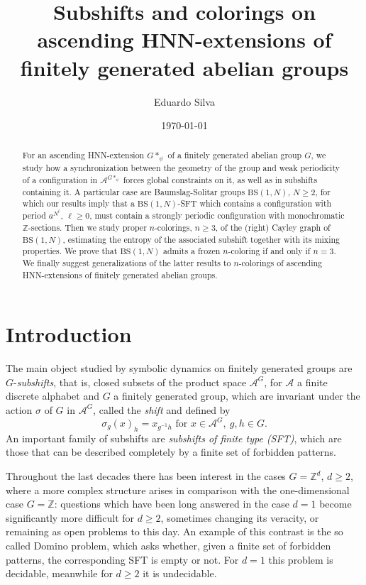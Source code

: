 \documentclass[letterpaper,11pt,reqno]{amsart}
\title{Subshifts and colorings on ascending HNN-extensions of finitely generated abelian groups}
\date{\today}
\author{Eduardo Silva}
\theoremstyle{plain}
\theoremstyle{definition}
\newcommand{\BS}[1][N]{\mathrm{BS}(1,#1)}
\begin{document}
	


\begin{abstract}
For an ascending HNN-extension $G*_{\psi}$ of a finitely generated abelian group $G$, we study how a synchronization between the geometry of the group and weak periodicity of a configuration in $\mathcal{A}^{G*_{\psi}}$ forces global constraints on it, as well as in subshifts containing it. A particular case are Baumslag-Solitar groups $\BS$, $N\ge2$, for which our results imply that a $\BS$-SFT which contains a configuration with period $a^{N^\ell}$, $\ell\ge 0$, must contain a strongly periodic configuration with monochromatic $\mathbb{Z}$-sections. Then we study proper $n$-colorings, $n\ge 3$, of the (right) Cayley graph of $\BS$, estimating the entropy of the associated subshift together with its mixing properties. We prove that $\BS$ admits a frozen $n$-coloring if and only if $n=3$. We finally suggest generalizations of the latter results to $n$-colorings of ascending HNN-extensions of finitely generated abelian groups.
\end{abstract}	
\maketitle 	



\section{Introduction}
\label{section:introduction}
The main object studied by symbolic dynamics on finitely generated groups are $G$-\textit{subshifts}, that is, closed subsets of the product space $\mathcal{A}^G$, for $\mathcal{A}$ a finite discrete alphabet and $G$ a finitely generated group, which are invariant under the action $\sigma$ of $G$ in $\mathcal{A}^G$, called the \textit{shift} and defined by
$$\sigma_g(x)_h=x_{g^{-1}h}\text{ for }x\in\mathcal{A}^G,\ g,h\in G.$$
An important family of subshifts are \textit{subshifts of finite type (SFT)}, which are those that can be described completely by a finite set of forbidden patterns.

Throughout the last decades there has been interest in the cases $G=\mathbb{Z}^d$, $d\ge 2$, where a more complex structure arises in comparison with the one-dimensional case $G=\mathbb{Z}$: questions which have been long answered in the case $d=1$ become significantly more difficult for $d\ge 2$, sometimes changing its veracity, or remaining as open problems to this day. An example of this contrast is the so called Domino problem, which asks whether, given a finite set of forbidden patterns, the corresponding SFT is empty or not. For $d=1$ this problem is decidable, meanwhile for $d\ge 2$ it is undecidable.
\end{document}
